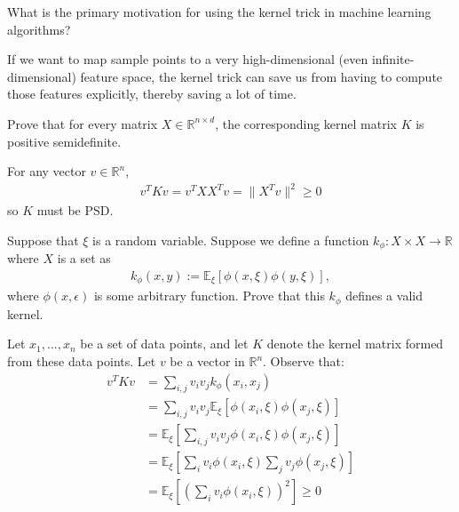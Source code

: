 
\begin{Parts}

\Part
What is the primary motivation for using the kernel trick in machine learning algorithms?

\begin{solution}
If we want to map sample points to a very high-dimensional (even infinite-dimensional) feature space, the kernel trick can save us from having to compute those features explicitly, thereby saving a lot of time.
\end{solution}

\Part
Prove that for every matrix $X \in \mathbb{R}^{n \times d}$, the corresponding kernel matrix $K$ is positive semidefinite.

\begin{solution} 
For any vector $v \in \mathbb{R}^n$, 
\begin{align}
    v^T K v = v^T XX^T v = \lVert X^T v \rVert^2 \geq 0
\end{align}
so $K$ must be PSD.

\end{solution}

\Part
Suppose that $\xi$ is a random variable. Suppose we define a function $k_{\phi}:X \times X \rightarrow \mathbb{R}$ where $X$ is a set as 
\begin{align}
    k_\phi(x,y) := \mathbb{E}_\xi [\phi(x,\xi)\phi(y,\xi)],
\end{align}
where $\phi(x, \epsilon)$ is some arbitrary function. Prove that this $k_\phi$ defines a valid kernel.


\begin{solution}
Let $x_1,...,x_n$ be a set of data points, and let $K$ denote the kernel matrix formed from these data points. Let $v$ be a vector in $\mathbb{R}^n$. Observe that:
\begin{align}
        v^T K v &= \sum\limits_{i, j} v_i v_j k_\phi(x_i, x_j) \\
        &= \sum\limits_{i, j} v_i v_j \mathbb{E}_\xi[\phi(x_i,\xi)\phi(x_j,\xi)] \\
        &= \mathbb{E}_\xi \left[ \sum\limits_{i, j} v_i v_j \phi(x_i,\xi)\phi(x_j,\xi) \right] \\
        &= \mathbb{E}_\xi \left[ \sum\limits_{i} v_i \phi(x_i,\xi) \sum\limits_{j} v_j \phi(x_j,\xi) \right] \\
        &= \mathbb{E}_\xi \left[ \left( \sum\limits_{i}  v_i \phi(x_i,\xi) \right)^2 \right] \geq 0
\end{align}


\end{solution}
\end{Parts}
